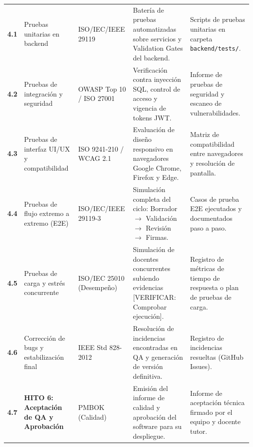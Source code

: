 \documentclass[12pt,a4paper]{article}
\begin{document}
\begin{longtable}{|>{\centering\arraybackslash}m{1.4cm}|>{\raggedright\arraybackslash}m{3.2cm}|>{\raggedright\arraybackslash}m{2.6cm}|>{\raggedright\arraybackslash}m{4.6cm}|>{\raggedright\arraybackslash}m{3.4cm}|}
\multicolumn{5}{|l|}{\cellcolor{lightgraybg}\textbf{FASE 4: PRUEBAS QA, SEGURIDAD E INTEGRACIÓN}} \\ \hline
\textbf{4.1} & Pruebas unitarias en backend & ISO/IEC/IEEE 29119 & Batería de pruebas automatizadas sobre servicios y Validation Gates del backend. & Scripts de pruebas unitarias en carpeta \texttt{backend/tests/}. \\ \hline
\textbf{4.2} & Pruebas de integración y seguridad & OWASP Top 10 / ISO 27001 & Verificación contra inyección SQL, control de acceso y vigencia de tokens JWT. & Informe de pruebas de seguridad y escaneo de vulnerabilidades. \\ \hline
\textbf{4.3} & Pruebas de interfaz UI/UX y compatibilidad & ISO 9241-210 / WCAG 2.1 & Evaluación de diseño responsivo en navegadores Google Chrome, Firefox y Edge. & Matriz de compatibilidad entre navegadores y resolución de pantalla. \\ \hline
\textbf{4.4} & Pruebas de flujo extremo a extremo (E2E) & ISO/IEC/IEEE 29119-3 & Simulación completa del ciclo: Borrador $\rightarrow$ Validación $\rightarrow$ Revisión $\rightarrow$ Firmas. & Casos de prueba E2E ejecutados y documentados paso a paso. \\ \hline
\textbf{4.5} & Pruebas de carga y estrés concurrente & ISO/IEC 25010 (Desempeño) & Simulación de docentes concurrentes subiendo evidencias [VERIFICAR: Comprobar ejecución]. & Registro de métricas de tiempo de respuesta o plan de pruebas de carga. \\ \hline
\textbf{4.6} & Corrección de bugs y estabilización final & IEEE Std 828-2012 & Resolución de incidencias encontradas en QA y generación de versión definitiva. & Registro de incidencias resueltas (GitHub Issues). \\ \hline
\textbf{4.7} & \textbf{HITO 6: Aceptación de QA y Aprobación} & PMBOK (Calidad) & Emisión del informe de calidad y aprobación del software para su despliegue. & Informe de aceptación técnica firmado por el equipo y docente tutor. \\ \hline


\end{longtable}
\end{document}
